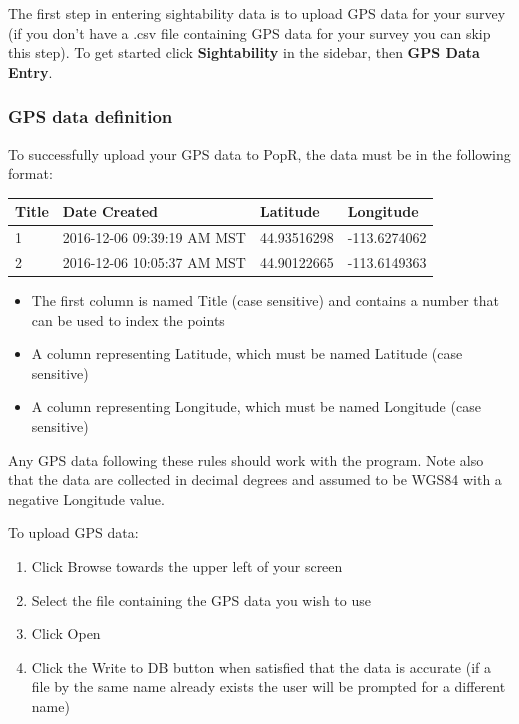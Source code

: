 \documentclass[
]{book}
\providecommand{\tightlist}{%
  \setlength{\itemsep}{0pt}\setlength{\parskip}{0pt}}
\begin{document}
The first step in entering sightability data is to upload GPS data for your survey (if you don't have a .csv file containing GPS data for your survey you can skip this step). To get started click \textbf{Sightability} in the sidebar, then \textbf{GPS Data Entry}.

\hypertarget{gps-data-definition}{%
\subsubsection*{GPS data definition}\label{gps-data-definition}}

To successfully upload your GPS data to PopR, the data must be in the following format:

\begin{longtable}[]{@{}llll@{}}
\toprule
Title & Date Created & Latitude & Longitude \\
\midrule
\endhead
1 & 2016-12-06 09:39:19 AM MST & 44.93516298 & -113.6274062 \\
2 & 2016-12-06 10:05:37 AM MST & 44.90122665 & -113.6149363 \\
\bottomrule
\end{longtable}

\begin{itemize}
\tightlist
\item
  The first column is named Title (case sensitive) and contains a number that can be used to index the points
\item
  A column representing Latitude, which must be named Latitude (case sensitive)
\item
  A column representing Longitude, which must be named Longitude (case sensitive)
\end{itemize}

Any GPS data following these rules should work with the program. Note also that the data are collected in decimal degrees and assumed to be WGS84 with a negative Longitude value.

To upload GPS data:

\begin{enumerate}
\def\labelenumi{\arabic{enumi}.}
\tightlist
\item
  Click Browse towards the upper left of your screen
\item
  Select the file containing the GPS data you wish to use
\item
  Click Open
\item
  Click the {Write to DB} button when satisfied that the data is accurate (if a file by the same name already exists the user will be prompted for a different name)
\end{enumerate}
\end{document}
